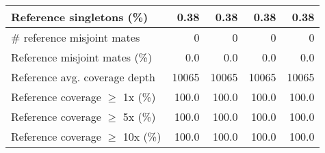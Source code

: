 \documentclass[12pt,a4paper]{article}
\begin{document}
\begin{table}[ht]
\begin{center}
\begin{tabular}{|l*{4}{|r}|}
Reference singletons (\%) & 0.38 & 0.38 & 0.38 & 0.38 \\ \hline
\# reference misjoint mates & 0 & 0 & 0 & 0 \\ \hline
Reference misjoint mates (\%) & 0.0 & 0.0 & 0.0 & 0.0 \\ \hline
Reference avg. coverage depth & 10065 & 10065 & 10065 & 10065 \\ \hline
Reference coverage $\geq$ 1x (\%) & 100.0 & 100.0 & 100.0 & 100.0 \\ \hline
Reference coverage $\geq$ 5x (\%) & 100.0 & 100.0 & 100.0 & 100.0 \\ \hline
Reference coverage $\geq$ 10x (\%) & 100.0 & 100.0 & 100.0 & 100.0 \\ \hline
\end{tabular}
\end{center}
\end{table}
\end{document}
